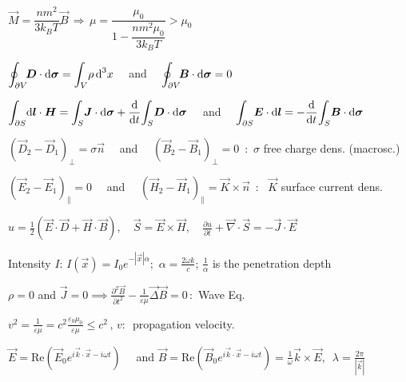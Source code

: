\item $\vec{M} = \dfrac{ n m^2}{3k_B T} \vec{B} \, \Rightarrow \, \mu = \dfrac{\mu_0}{1-\dfrac{nm^2\mu_0}{3k_BT}} > \mu_0$\\
\squishend
{}
\squishlist
\item $\displaystyle{\oint_{\partial V}} \! \mbox{\boldmath$D$}\cdot\mbox{\boldmath$\textrm{d} \sigma$} = \displaystyle{\int_V} \rho \, \textrm{d} ^3x \quad$ and $\quad \displaystyle{\oint_{\partial V}} \! \mbox{\boldmath$B$}\cdot\mbox{\boldmath$\textrm{d} \sigma$} = 0$

\item $\displaystyle{\int_{\partial S}} \mbox{\boldmath$\textrm{d} l$}\cdot\mbox{\boldmath$H$} = \displaystyle{\int_S} \mbox{\boldmath$J$}\cdot\mbox{\boldmath$\textrm{d} \sigma$} + \frac{\textrm{d} }{\textrm{d} t} \displaystyle{\int_S} \mbox{\boldmath$D$}\cdot\mbox{\boldmath$\textrm{d} \sigma$} \quad $ and  $\quad \displaystyle{\int_{\partial S }} \mbox{\boldmath$E$} \cdot \mbox{\boldmath$\textrm{d} l$} = -\frac{\textrm{d} }{\textrm{d} t} \displaystyle{\int_S} \mbox{\boldmath$B$} \cdot \mbox{\boldmath$\textrm{d} \sigma$}$

\item $(\vec{D}_2 - \vec{D}_1)_{\perp} = \sigma \vec{n} \quad$ and  $\quad (\vec{B}_2 - \vec{B}_1)_{\perp} = 0 \,$ :\, $\sigma$ free charge dens. (macrosc.)

\item $(\vec{E}_2 - \vec{E}_1)_{\parallel} = 0 \quad $ and  $\quad (\vec{H}_2 - \vec{H}_1)_{\parallel} = \vec{K} \times \vec{n} \,$ : \, $\vec{K}$ surface current dens.
\squishend
{}
\squishlist

\item $u = \frac{1}{2}(\vec{E}\cdot\vec{D} + \vec{H}\cdot\vec{B}), \quad \vec{S} = \vec{E} \times \vec{H}, \quad \frac{\partial u}{\partial t} + \vec{\nabla}\cdot\vec{S} = - \vec{J}\cdot\vec{E}$

\item Intensity $I$: $I(\vec{x})=I_0e^{-|\vec{x}|\alpha}; $ $\alpha=\frac{2\omega k}{c}$; $ \frac{1}{\alpha}$ is the penetration depth
\squishend
{}
\squishlist
\item $\rho = 0$ and  $\vec{J} = 0  \implies  \frac{\partial^2 \vec{B}}{\partial t^2} - \frac{1}{\varepsilon \mu} \vec{\Delta}\vec{B}=0 \, :$  Wave Eq.

\item $v^2 = \frac{1}{\varepsilon\mu} = c^2 \frac{\varepsilon_0\mu_0}{\varepsilon \mu} \leq c^2 \, , \, v : \,$ propagation velocity. 

\item $\vec{E} = \text{Re}\left(\vec{E}_0 e^{i\vec{k}\cdot\vec{x} - i\omega t}\right) \quad $ and  $\vec{B} = \text{Re}\left(\vec{B}_0 e^{i\vec{k}\cdot\vec{x} - i\omega t}\right) = \frac{1}{\omega} \vec{k}\times\vec{E} , \, $  $\lambda = \frac{2\pi}{|\vec{k}|}$
\squishend

